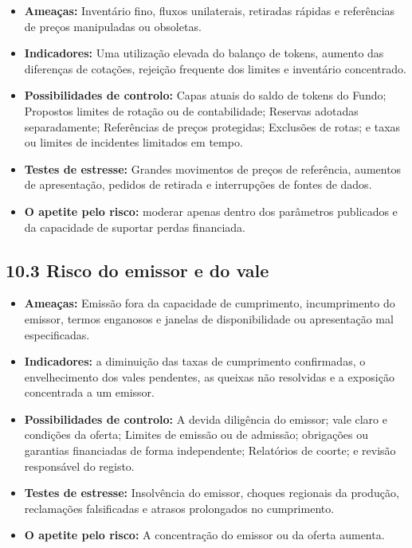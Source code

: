 \documentclass[11pt]{article}
\begin{document}
\begin{itemize}[leftmargin=*]
\item \textbf{Ameaças:} Inventário fino, fluxos unilaterais, retiradas rápidas e referências de preços manipuladas ou obsoletas.
\item \textbf{Indicadores:} Uma utilização elevada do balanço de tokens, aumento das diferenças de cotações, rejeição frequente dos limites e inventário concentrado.
\item \textbf{Possibilidades de controlo:} Capas atuais do saldo de tokens do Fundo; Propostos limites de rotação ou de contabilidade; Reservas adotadas separadamente; Referências de preços protegidas; Exclusões de rotas; e taxas ou limites de incidentes limitados em tempo.
\item \textbf{Testes de estresse:} Grandes movimentos de preços de referência, aumentos de apresentação, pedidos de retirada e interrupções de fontes de dados.
\item \textbf{O apetite pelo risco:} moderar apenas dentro dos parâmetros publicados e da capacidade de suportar perdas financiada.
\end{itemize}
\subsection*{10.3 Risco do emissor e do vale}

\begin{itemize}[leftmargin=*]
\item \textbf{Ameaças:} Emissão fora da capacidade de cumprimento, incumprimento do emissor, termos enganosos e janelas de disponibilidade ou apresentação mal especificadas.
\item \textbf{Indicadores:} a diminuição das taxas de cumprimento confirmadas, o envelhecimento dos vales pendentes, as queixas não resolvidas e a exposição concentrada a um emissor.
\item \textbf{Possibilidades de controlo:} A devida diligência do emissor; vale claro e condições da oferta; Limites de emissão ou de admissão; obrigações ou garantias financiadas de forma independente; Relatórios de coorte; e revisão responsável do registo.
\item \textbf{Testes de estresse:} Insolvência do emissor, choques regionais da produção, reclamações falsificadas e atrasos prolongados no cumprimento.
\item \textbf{O apetite pelo risco:} A concentração do emissor ou da oferta aumenta.
\end{itemize}
\end{document}
